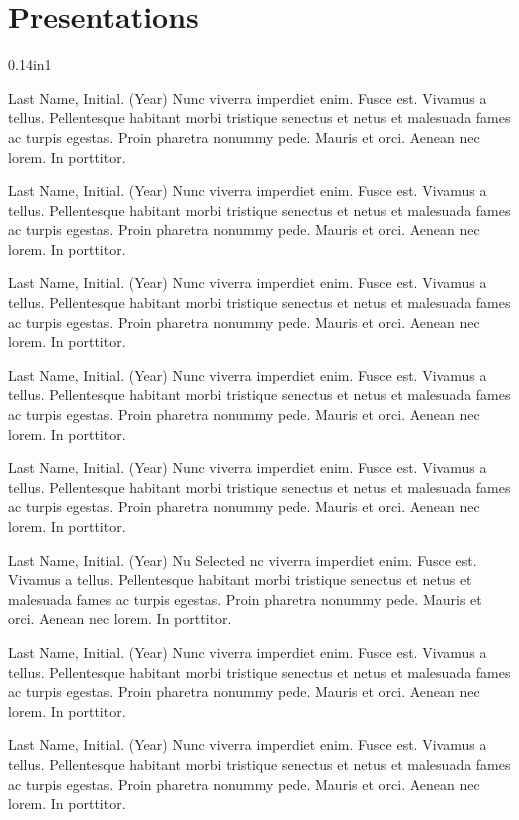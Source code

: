 \documentclass[10pt]{article}
\begin{document}
\section*{Presentations}
\begin{hangparas}{0.14in}{1}

Last Name, Initial. (Year) Nunc viverra imperdiet enim. Fusce est. Vivamus a tellus. Pellentesque habitant morbi tristique senectus et netus et malesuada fames ac turpis egestas. Proin pharetra nonummy pede. Mauris et orci. Aenean nec lorem. In porttitor. 

Last Name, Initial. (Year) Nunc viverra imperdiet enim. Fusce est. Vivamus a tellus. Pellentesque habitant morbi tristique senectus et netus et malesuada fames ac turpis egestas. Proin pharetra nonummy pede. Mauris et orci. Aenean nec lorem. In porttitor. 

Last Name, Initial. (Year) Nunc viverra imperdiet enim. Fusce est. Vivamus a tellus. Pellentesque habitant morbi tristique senectus et netus et malesuada fames ac turpis egestas. Proin pharetra nonummy pede. Mauris et orci. Aenean nec lorem. In porttitor. 

Last Name, Initial. (Year) Nunc viverra imperdiet enim. Fusce est. Vivamus a tellus. Pellentesque habitant morbi tristique senectus et netus et malesuada fames ac turpis egestas. Proin pharetra nonummy pede. Mauris et orci. Aenean nec lorem. In porttitor. 

Last Name, Initial. (Year) Nunc viverra imperdiet enim. Fusce est. Vivamus a tellus. Pellentesque habitant morbi tristique senectus et netus et malesuada fames ac turpis egestas. Proin pharetra nonummy pede. Mauris et orci. Aenean nec lorem. In porttitor. 

Last Name, Initial. (Year) Nu Selected nc viverra imperdiet enim. Fusce est. Vivamus a tellus. Pellentesque habitant morbi tristique senectus et netus et malesuada fames ac turpis egestas. Proin pharetra nonummy pede. Mauris et orci. Aenean nec lorem. In porttitor. 

Last Name, Initial. (Year) Nunc viverra imperdiet enim. Fusce est. Vivamus a tellus. Pellentesque habitant morbi tristique senectus et netus et malesuada fames ac turpis egestas. Proin pharetra nonummy pede. Mauris et orci. Aenean nec lorem. In porttitor. 

Last Name, Initial. (Year) Nunc viverra imperdiet enim. Fusce est. Vivamus a tellus. Pellentesque habitant morbi tristique senectus et netus et malesuada fames ac turpis egestas. Proin pharetra nonummy pede. Mauris et orci. Aenean nec lorem. In porttitor. 


\end{hangparas}
\end{document}

